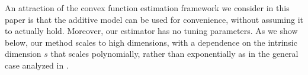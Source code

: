 An attraction of the convex function estimation
framework we consider in this paper
is that the additive model can be
used for convenience, without assuming it
to actually hold.  Moreover, our estimator has
no tuning parameters.  As we show below,
our method scales to high dimensions, with
a dependence on the intrinsic dimension $s$ 
that scales polynomially, rather than exponentially
as in the general case analyzed in \cite{dalalyan:12}.


%
%
%
%
%
%
%
%
